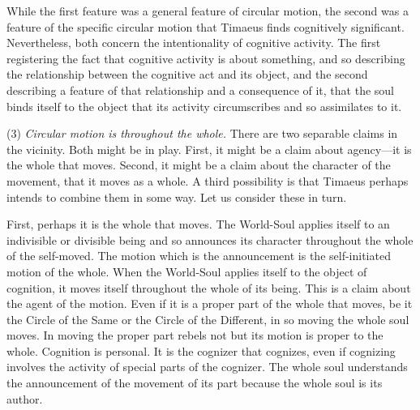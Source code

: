 While the first feature was a general feature of circular motion, the second was a feature of the specific circular motion that Timaeus finds cognitively significant. Nevertheless, both concern the intentionality of cognitive activity. The first registering the fact that cognitive activity is about something, and so describing the relationship between the cognitive act and its object, and the second describing a feature of that relationship and a consequence of it, that the soul binds itself to the object that its activity circumscribes and so assimilates to it.

(3) \emph{Circular motion is throughout the whole.} There are two separable claims in the vicinity. Both might be in play. First, it might be a claim about agency---it is the whole that moves. Second, it might be a claim about the character of the movement, that it moves as a whole. A third possibility is that Timaeus perhaps intends to combine them in some way. Let us consider these in turn. 

First, perhaps it is the whole that moves. The World-Soul applies itself to an indivisible or divisible being and so announces its character throughout the whole of the self-moved. The motion which is the announcement is the self-initiated motion of the whole. When the World-Soul applies itself to the object of cognition, it moves itself throughout the whole of its being. This is a claim about the agent of the motion. Even if it is a proper part of the whole that moves, be it the Circle of the Same or the Circle of the Different, in so moving the whole soul moves. In moving the proper part rebels not but its motion is proper to the whole. Cognition is personal. It is the cognizer that cognizes, even if cognizing involves the activity of special parts of the cognizer. The whole soul understands the announcement of the movement of its part because the whole soul is its author.

